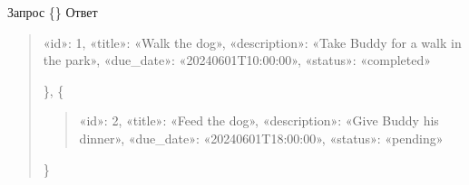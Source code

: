 \documentclass[letterpaper,10pt,russian]{sphinxmanual}
\begin{document}
\sphinxAtStartPar
Запрос
\{\}
Ответ
\begin{quote}
\begin{description}
\sphinxlineitem{\{}
\sphinxAtStartPar
«id»: 1,
«title»: «Walk the dog»,
«description»: «Take Buddy for a walk in the park»,
«due\_date»: «2024\sphinxhyphen{}06\sphinxhyphen{}01T10:00:00»,
«status»: «completed»

\end{description}

\sphinxAtStartPar
\},
\{
\begin{quote}

\sphinxAtStartPar
«id»: 2,
«title»: «Feed the dog»,
«description»: «Give Buddy his dinner»,
«due\_date»: «2024\sphinxhyphen{}06\sphinxhyphen{}01T18:00:00»,
«status»: «pending»
\end{quote}

\sphinxAtStartPar
\}
\end{quote}



\renewcommand{\indexname}{Алфавитный указатель}
\printindex
\end{document}
